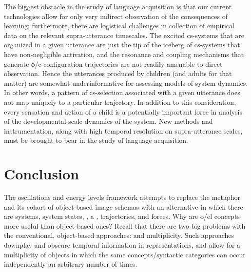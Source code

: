 The biggest obstacle in the study of language acquisition is that our current technologies allow for only very indirect observation of the consequences of learning; furthermore, there are logistical challenges in collection of empirical data on the relevant supra-utterance timescales. The excited cs-systems that are organized in a given utterance are just the tip of the iceberg of cs-systems that have non-negligible activation, and the resonance and coupling mechanisms that generate ϕ/e-configuration trajectories are not readily amenable to direct observation. Hence the utterances produced by children (and adults for that matter) are somewhat underinformative for assessing models of system dynamics. In other words, a pattern of cs-selection associated with a given utterance does not map uniquely to a particular trajectory. In addition to this consideration, every sensation and action of a child is a potentially important  force in analysis of the developmental-scale dynamics of the system. New methods and instrumentation, along with high temporal resolution on supra-utterance scales, must be brought to bear in the study of language acquisition.

\section{Conclusion}

The oscillations and energy levels framework attempts to replace the  metaphor and its cohort of object-based image schemas with an alternative in which there are systems, system states, , a , trajectories, and forces. Why are o/el concepts more useful than object-based ones? Recall that there are two big problems with the conventional, object-based approaches:  and multiplicity. Such approaches downplay and obscure temporal information in representations, and allow for a multiplicity of objects in which the same concepts/syntactic categories can occur independently an arbitrary number of times. 

